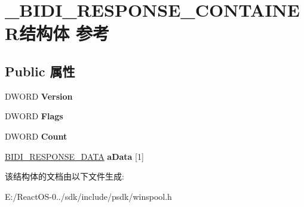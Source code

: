 \hypertarget{struct___b_i_d_i___r_e_s_p_o_n_s_e___c_o_n_t_a_i_n_e_r}{}\section{\+\_\+\+B\+I\+D\+I\+\_\+\+R\+E\+S\+P\+O\+N\+S\+E\+\_\+\+C\+O\+N\+T\+A\+I\+N\+E\+R结构体 参考}
\label{struct___b_i_d_i___r_e_s_p_o_n_s_e___c_o_n_t_a_i_n_e_r}
\subsection*{Public 属性}
\begin{DoxyCompactItemize}
\item 
\mbox{\label{struct___b_i_d_i___r_e_s_p_o_n_s_e___c_o_n_t_a_i_n_e_r_a8fbb567e4cecfbb3543e25b395e6f180}} 
D\+W\+O\+RD {\bfseries Version}
\item 
\mbox{\label{struct___b_i_d_i___r_e_s_p_o_n_s_e___c_o_n_t_a_i_n_e_r_a40ecef26dff986f70ef643dfaea50436}} 
D\+W\+O\+RD {\bfseries Flags}
\item 
\mbox{\label{struct___b_i_d_i___r_e_s_p_o_n_s_e___c_o_n_t_a_i_n_e_r_a2bb82f4605726091d193615ace7a4142}} 
D\+W\+O\+RD {\bfseries Count}
\item 
\mbox{\label{struct___b_i_d_i___r_e_s_p_o_n_s_e___c_o_n_t_a_i_n_e_r_aa6a9cd9e012c914a5c874199b7e464e8}} 
\hyperlink{struct___b_i_d_i___r_e_s_p_o_n_s_e___d_a_t_a}{B\+I\+D\+I\+\_\+\+R\+E\+S\+P\+O\+N\+S\+E\+\_\+\+D\+A\+TA} {\bfseries a\+Data} \mbox{[}1\mbox{]}
\end{DoxyCompactItemize}


该结构体的文档由以下文件生成\+:\begin{DoxyCompactItemize}
\item 
E\+:/\+React\+O\+S-\/0../sdk/include/psdk/winspool.\+h\end{DoxyCompactItemize}
